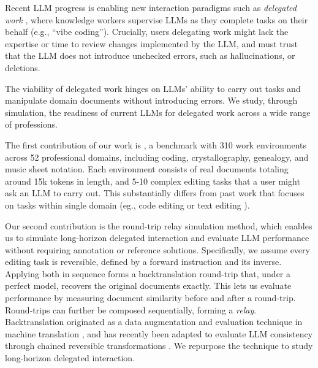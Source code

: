 \documentclass{article} %
\begin{document}
Recent LLM progress is enabling new interaction paradigms such as \textit{delegated work} \citep{Shao2025FutureOW, Ulloa2025ProductMP}, where knowledge workers supervise LLMs as they complete tasks on their behalf (e.g., ``vibe coding''). Crucially, users delegating work might lack the expertise or time to review changes implemented by the LLM, and must trust that the LLM does not introduce unchecked errors, such as hallucinations, or deletions.

The viability of delegated work hinges on LLMs' ability to carry out tasks and manipulate domain documents without introducing errors. We study, through simulation, the readiness of current LLMs for delegated work across a wide range of professions.

The first contribution of our work is \benchmark{}, a benchmark with 310 work environments across 52 professional domains, including coding, crystallography, genealogy, and music sheet notation. Each environment consists of real documents totaling around 15k tokens in length, and 5-10 complex editing tasks that a user might ask an LLM to carry out. This substantially differs from past work that focuses on tasks within single domain (eg., code editing \citep{Cassano2023CanIE} or text editing \citep{Spangher2022NewsEditsAN}).

Our second contribution is the round-trip relay simulation method, which enables us to simulate long-horizon delegated interaction and evaluate LLM performance without requiring annotation or reference solutions. Specifically, we assume every editing task is reversible, defined by a forward instruction and its inverse. Applying both in sequence forms a backtranslation round-trip that, under a perfect model, recovers the original documents exactly. This lets us evaluate performance by measuring document similarity before and after a round-trip. Round-trips can further be composed sequentially, forming a \textit{relay}. Backtranslation originated as a data augmentation and evaluation technique in machine translation \citep{Sennrich2015ImprovingNM,Somers2005RoundtripTW}, and has recently been adapted to evaluate LLM consistency through chained reversible transformations \citep{Hong2025ConsistencyCheckerTE,Allamanis2024UnsupervisedEO}. We repurpose the technique to study long-horizon delegated interaction. %
\end{document}
